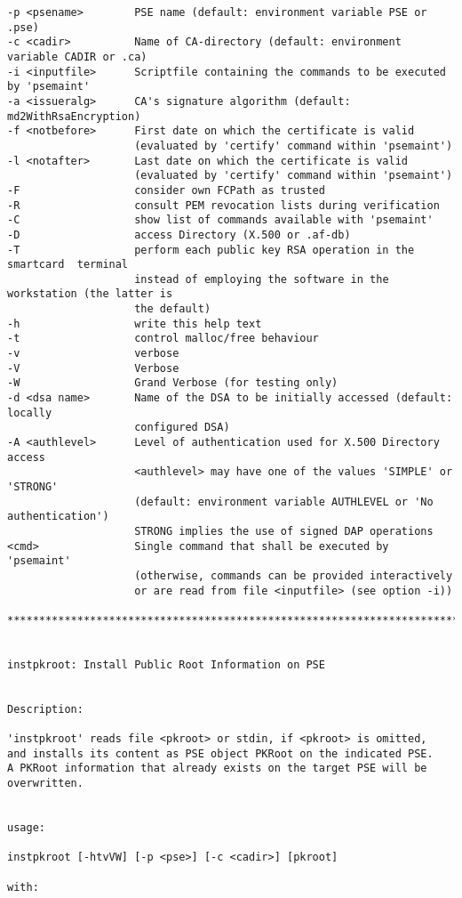 {\begin{verbatim}
-p <psename>        PSE name (default: environment variable PSE or .pse)
-c <cadir>          Name of CA-directory (default: environment variable CADIR or .ca)
-i <inputfile>      Scriptfile containing the commands to be executed by 'psemaint'
-a <issueralg>      CA's signature algorithm (default: md2WithRsaEncryption)
-f <notbefore>      First date on which the certificate is valid
                    (evaluated by 'certify' command within 'psemaint')
-l <notafter>       Last date on which the certificate is valid
                    (evaluated by 'certify' command within 'psemaint')
-F                  consider own FCPath as trusted
-R                  consult PEM revocation lists during verification
-C                  show list of commands available with 'psemaint'
-D                  access Directory (X.500 or .af-db)
-T                  perform each public key RSA operation in the smartcard  terminal
                    instead of employing the software in the workstation (the latter is 
                    the default)
-h                  write this help text
-t                  control malloc/free behaviour
-v                  verbose
-V                  Verbose
-W                  Grand Verbose (for testing only)
-d <dsa name>       Name of the DSA to be initially accessed (default: locally 
                    configured DSA)
-A <authlevel>      Level of authentication used for X.500 Directory access
                    <authlevel> may have one of the values 'SIMPLE' or 'STRONG'
                    (default: environment variable AUTHLEVEL or 'No authentication')
                    STRONG implies the use of signed DAP operations
<cmd>               Single command that shall be executed by 'psemaint'
                    (otherwise, commands can be provided interactively
                    or are read from file <inputfile> (see option -i))

****************************************************************************************


instpkroot: Install Public Root Information on PSE


Description:

'instpkroot' reads file <pkroot> or stdin, if <pkroot> is omitted,
and installs its content as PSE object PKRoot on the indicated PSE.
A PKRoot information that already exists on the target PSE will be overwritten.


usage:

instpkroot [-htvVW] [-p <pse>] [-c <cadir>] [pkroot]

with:


\end{verbatim}}
